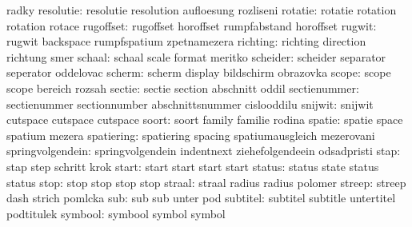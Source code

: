                        radky
           resolutie:  resolutie            resolution           aufloesung
                       rozliseni
             rotatie:  rotatie              rotation             rotation
                       rotace
           rugoffset:  rugoffset            horoffset            rumpfabstand
                       horoffset
              rugwit:  rugwit               backspace            rumpfspatium
                       zpetnamezera
            richting:  richting             direction            richtung
                       smer 
              schaal:  schaal               scale                format
                       meritko
            scheider:  scheider             separator            seperator
                       oddelovac
              scherm:  scherm               display              bildschirm
                       obrazovka
               scope:  scope                scope                bereich
                       rozsah
              sectie:  sectie               section              abschnitt
                       oddil
        sectienummer:  sectienummer         sectionnumber        abschnittsnummer
                       cislooddilu
             snijwit:  snijwit              cutspace             cutspace 
                       cutspace
               soort:  soort                family               familie
                       rodina
              spatie:  spatie               space                spatium
                       mezera
          spatiering:  spatiering           spacing              spatiumausgleich
                       mezerovani
    springvolgendein:  springvolgendein     indentnext           ziehefolgendeein
                       odsadpristi
                stap:  stap                 step                 schritt
                       krok
               start:  start                start                start
                       start
              status:  status               state                status
                       status
                stop:  stop                 stop                 stop
                       stop
              straal:  straal               radius               radius
                       polomer
              streep:  streep               dash                 strich
                       pomlcka
                 sub:  sub                  sub                  unter
                       pod
            subtitel:  subtitel             subtitle             untertitel
                       podtitulek
             symbool:  symbool              symbol               symbol
